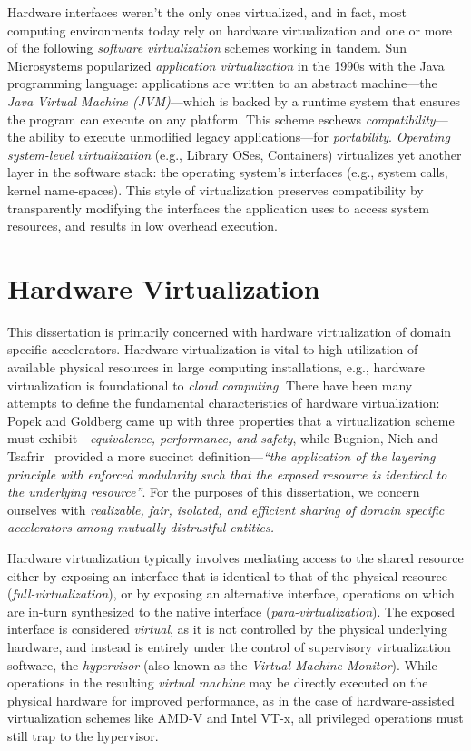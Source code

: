 Hardware interfaces weren't the only ones virtualized, and in fact, most
computing environments today rely on hardware virtualization and one or more
of the following \emph{software virtualization} schemes working in tandem.
Sun Microsystems popularized \emph{application virtualization} in the 1990s
with the Java programming language: applications are written to an abstract
machine---the \emph{Java Virtual Machine (JVM)}---which is backed by a runtime
system that ensures the program can execute on any platform.
This scheme eschews \emph{compatibility}---the ability to execute unmodified
legacy applications---for \emph{portability}.
\emph{Operating system-level virtualization} (e.g., Library OSes, Containers)
virtualizes yet another layer in the software stack: the operating system's
interfaces (e.g., system calls, kernel name-spaces). This style of
virtualization preserves compatibility by transparently modifying the
interfaces the application uses to access system resources, and results in
low overhead execution.

\section{Hardware Virtualization}
This dissertation is primarily concerned with hardware virtualization of
domain specific accelerators. Hardware virtualization is vital to high
utilization of available physical resources in large computing installations,
e.g., hardware virtualization is foundational to \textit{cloud computing}.
There have been many attempts to define the fundamental characteristics of
hardware virtualization: Popek and Goldberg came up with three properties that
a virtualization scheme must exhibit---\emph{equivalence, performance, and
safety}, while Bugnion, Nieh and Tsafrir~\cite{ bugnion-nieh-tsafrir} provided
a more succinct definition---\textit{``the application of the layering
principle with enforced modularity such that the exposed resource is identical
to the underlying resource''}. For the purposes of this dissertation, we
concern ourselves with \emph{realizable, fair, isolated, and efficient sharing
of domain specific accelerators among mutually distrustful entities.}

Hardware virtualization typically involves mediating access to the shared
resource either by exposing an interface that is identical to that of the
physical resource (\emph{full-virtualization}), or by exposing an alternative
interface, operations on which are in-turn synthesized to the native interface
(\emph{para-virtualization}).
The exposed interface is considered \emph{virtual}, as it is not controlled by
the physical underlying hardware, and instead is entirely under the control of
supervisory virtualization software, the \emph{hypervisor} (also known as the
\emph{Virtual Machine Monitor}). While operations in the resulting \emph{
virtual machine} may be directly executed on the physical hardware for
improved performance, as in the case of hardware-assisted virtualization
schemes like AMD-V and Intel VT-x, all privileged operations must still trap
to the hypervisor.

